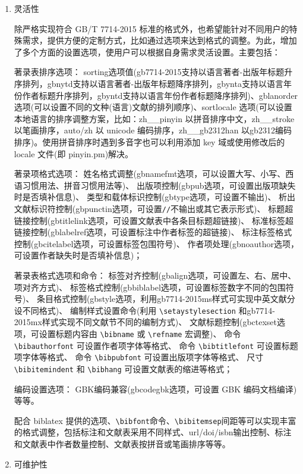 \documentclass[11pt]{article} %
\begin{document}
\begin{enumerate}
  \item 灵活性

除严格实现符合 GB/T 7714-2015 标准的格式外，也希望能针对不同用户的特殊需求，提供方便的定制方式，比如通过选项来达到格式的调整。为此，增加了多个方面的设置选项，使用户可以根据自身需求灵活设置。主要包括：

著录表排序选项：
sorting选项值(gb7714-2015支持以语言著者-出版年标题升序排列，gbnytd支持以语言著者-出版年标题降序排列，gbynta支持以语言年份作者标题升序排列，gbyntd支持以语言年份作者标题降序排列)、gblanorder 选项(可以设置不同的文种(语言)文献的排列顺序)、sortlocale 选项(可以设置本地语言的排序调整方案，比如：zh\_\_pinyin 以拼音排序中文，zh\_\_stroke 以笔画排序，auto/zh 以 unicode 编码排序，zh\_\_gb2312han 以gb2312编码排序)。使用拼音排序时遇到多音字也可以利用添加 key 域或使用修改后的 locale 文件(即 pinyin.pm)解决。


著录项格式选项：
姓名格式调整(gbnamefmt选项，可以设置大写、小写、西语习惯用法、拼音习惯用法等)、
出版项控制(gbpub选项，可设置出版项缺失时是否填补信息)、
类型和载体标识控制(gbtype选项，可设置不输出)、
析出文献标识符控制(gbpunctin选项，可设置\texttt{//}不输出或其它表示形式)、
标题超链接控制(gbtitlelink选项，可设置文献表中各条目标题超链接)、
标准标签超链接控制(gblabelref选项，可设置标注中作者标签的超链接)、
标注标签格式控制(gbcitelabel选项，可设置标签包围符号)、
作者项处理(gbnoauthor选项，可设置作者缺失时是否填补信息)；

著录表格式选项和命令：
标签对齐控制(gbalign选项，可设置左、右、居中、项对齐方式)、
标签格式控制(gbbiblabel选项，可设置标签数字不同的包围符号)、
条目格式控制(gbstyle选项，利用gb7714-2015ms样式可实现中英文献分设不同格式)、
编制样式设置命令(利用 \verb|\setaystylesection| 和gb7714-2015mx样式实现不同文献节不同的编制方式)、
文献标题控制(gbctexset选项，可设置标题内容由 \verb|\bibname| 或 \verb|\refname| 宏调整)、
命令 \verb|\bibauthorfont| 可设置作者项字体等格式、
命令 \verb|\bibtitlefont| 可设置标题项字体等格式、
命令 \verb|\bibpubfont| 可设置出版项字体等格式、
尺寸 \verb|\bibitemindent| 和 \verb|\bibhang| 可设置文献表的缩进等格式；

编码设置选项：
GBK编码兼容(gbcodegbk选项，可设置 GBK 编码文档编译)等等。

配合 biblatex 提供的选项、\verb|\bibfont|命令、\verb|\bibitemsep|间距等可以实现丰富的格式调整，包括标注和文献表采用不同样式、url/doi/isbn输出控制、标注和文献表中作者数量控制、文献表按拼音或笔画排序等等。


  \item 可维护性


\end{enumerate}
\end{document}
